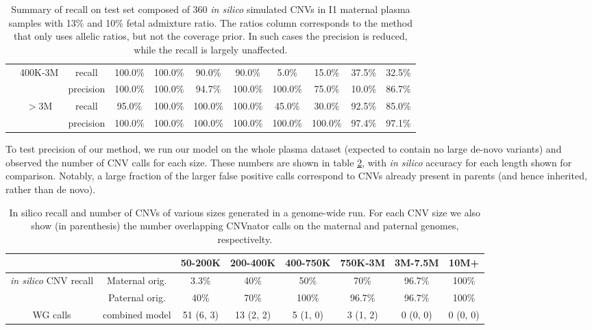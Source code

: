 \begin{table}[t]
\begin{tabular}{c|c|c||c|c||c|c||c|c||c|c}
    &    400K-3M    &    recall    &    100.0\%    &    100.0\%    &    90.0\%    &    90.0\%    &    5.0\%    &    15.0\%    &    37.5\%    &    32.5\%    \\    
    &        &    precision    &    100.0\%    &    100.0\%    &    94.7\%    &    100.0\%    &    100.0\%    &    75.0\%    &    10.0\%    &    86.7\%    \\    
    &    $>$3M    &    recall    &    95.0\%    &    100.0\%    &    100.0\%    &    100.0\%    &    45.0\%    &    30.0\%    &    92.5\%    &    85.0\%    \\    
    &        &    precision    &    100.0\%    &    100.0\%    &    100.0\%    &    100.0\%    &    100.0\%    &    100.0\%    &    97.4\%    &    97.1\%    \\   	
\end{tabular}
\caption{Summary of recall on test set composed of 360 \emph{in silico} simulated CNVs in I1 maternal plasma samples with 13\% and 10\% fetal admixture ratio. The ratios column corresponds to the method that only uses allelic ratios, but not the coverage prior. In such cases the precision is reduced, while the recall is largely unaffected.  }
\label{tab:resRecall} 
\end{table}

To test precision of our method, we run our model on the whole plasma dataset (expected to contain no large de-novo variants) and observed the number of CNV calls for each size. These numbers are shown in table \ref{tab:resWGS}, with \textit{in silico} accuracy for each length shown for comparison. Notably, a large fraction of the larger false positive calls correspond to CNVs already present in parents (and hence inherited, rather than de novo). 


\begin{table}[t]
\centering
\begin{tabular}{c|c|c|c|c|c|c|c}
	&		&	50-200K	&	200-400K	&	400-750K	&	750K-3M	&	3M-7.5M	&	10M+ \\ \hline
\multirow{2}{*}{\emph{in silico} CNV recall}	&	Maternal orig.	&	3.3\%	&	40\%	&	50\%	&	70\%	&	96.7\%	&	100\%	\\
	&	Paternal orig.	&	40\%	&	70\%	&	100\%	&	96.7\%	&	96.7\%	&	100\%	\\ \hline
\multirow{2}{*}{WG calls}	&	combined model	&	51 (6, 3)	&	13 (2, 2)	&	5 (1, 0)	&	3 (1, 2)	&	0 (0, 0)	&	0 (0, 0)	\\
\end{tabular}
\caption{In silico recall and number of CNVs of various sizes generated in a genome-wide run. For each CNV size we also show (in parenthesis) the number overlapping  CNVnator \cite{abyzov2011cnvnator} calls on the maternal and paternal genomes, respectivelty.}
\label{tab:resWGS} 
\end{table}
\vspace{1cm}



